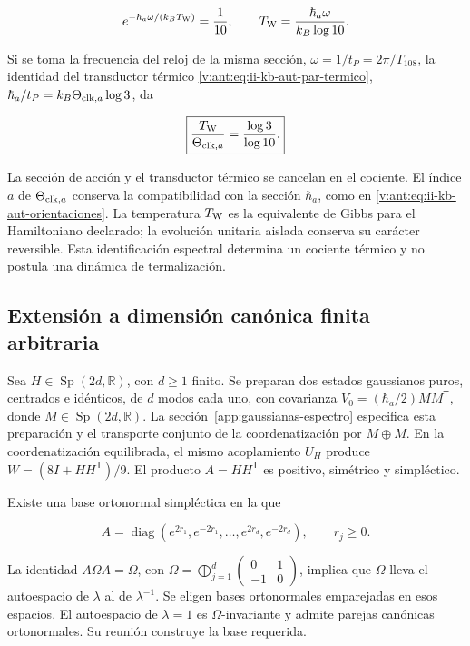 \[
e^{-\hbar_a\omega/(k_BT_{\rm W})}=\frac1{10},\qquad
T_{\rm W}=\frac{\hbar_a\omega}{k_B\log10}.
\]



Si se toma la frecuencia del reloj de la misma sección, \(\omega=1/t_P=2\pi/T_{108}\), la identidad del transductor térmico \eqref{v:ant:eq:ii-kb-aut-par-termico},
\(\hbar_a/t_P=k_B\Theta_{{\rm clk},a}\log3\), da



\begin{equation}
\boxed{\frac{T_{\rm W}}{\Theta_{{\rm clk},a}}=\frac{\log3}{\log10}.}
\label{nuc12:eq:5.11}
\end{equation}



La sección de acción y el transductor térmico se cancelan en el cociente. El índice \(a\) de \(\Theta_{{\rm clk},a}\) conserva la compatibilidad con la sección \(\hbar_a\), como en \eqref{v:ant:eq:ii-kb-aut-orientaciones}. La temperatura \(T_{\rm W}\) es la equivalente de Gibbs para el Hamiltoniano declarado; la evolución unitaria aislada conserva su carácter reversible. Esta identificación espectral determina un cociente térmico y no postula una dinámica de termalización.

\subsection{Extensión a dimensión canónica finita arbitraria}

Sea \(H\in\operatorname{Sp}(2d,\mathbb R)\), con \(d\geq1\) finito. Se preparan dos estados gaussianos puros, centrados e idénticos, de \(d\) modos cada uno, con covarianza \(V_0=(\hbar_a/2)MM^{\mathsf T}\), donde \(M\in\operatorname{Sp}(2d,\mathbb R)\). La sección~\ref{app:gaussianas-espectro} especifica esta preparación y el transporte conjunto de la coordenatización por \(M\oplus M\). En la coordenatización equilibrada, el mismo acoplamiento \(U_H\) produce \(W=(8I+HH^{\mathsf T})/9\). El producto \(A=HH^{\mathsf T}\) es positivo, simétrico y simpléctico.

Existe una base ortonormal simpléctica en la que


\[
A=\operatorname{diag}(e^{2r_1},e^{-2r_1},\ldots,
e^{2r_d},e^{-2r_d}),\qquad r_j\ge0.
\]



La identidad \(A\Omega A=\Omega\), con \(\Omega=\bigoplus_{j=1}^d\left(\begin{smallmatrix}0&1\\-1&0\end{smallmatrix}\right)\), implica que \(\Omega\) lleva el autoespacio de \(\lambda\) al de \(\lambda^{-1}\). Se eligen bases ortonormales emparejadas en esos espacios. El autoespacio de \(\lambda=1\) es \(\Omega\)-invariante y admite parejas canónicas ortonormales. Su reunión construye la base requerida.

